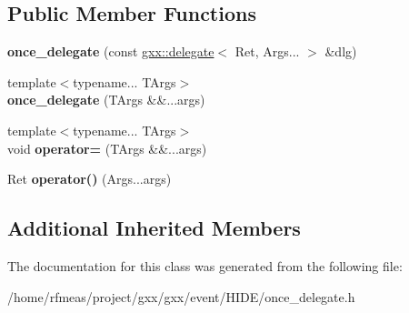 \subsection*{Public Member Functions}
\begin{DoxyCompactItemize}
\item 
{\bfseries once\+\_\+delegate} (const \hyperlink{classgxx_1_1delegate}{gxx\+::delegate}$<$ Ret, Args... $>$ \&dlg)\hypertarget{classgxx_1_1once__delegate_a373ca7b9d120e8d574b3cf8362bbf20b}{}\label{classgxx_1_1once__delegate_a373ca7b9d120e8d574b3cf8362bbf20b}

\item 
{\footnotesize template$<$typename... T\+Args$>$ }\\{\bfseries once\+\_\+delegate} (T\+Args \&\&...args)\hypertarget{classgxx_1_1once__delegate_af947eadfac65f56b0cf446f0d43f0e60}{}\label{classgxx_1_1once__delegate_af947eadfac65f56b0cf446f0d43f0e60}

\item 
{\footnotesize template$<$typename... T\+Args$>$ }\\void {\bfseries operator=} (T\+Args \&\&...args)\hypertarget{classgxx_1_1once__delegate_aee1783b954deb03a7c46e6d1b1c64884}{}\label{classgxx_1_1once__delegate_aee1783b954deb03a7c46e6d1b1c64884}

\item 
Ret {\bfseries operator()} (Args...\+args)\hypertarget{classgxx_1_1once__delegate_a258dca6fed8176ab2f3bc3575cb376c9}{}\label{classgxx_1_1once__delegate_a258dca6fed8176ab2f3bc3575cb376c9}

\end{DoxyCompactItemize}
\subsection*{Additional Inherited Members}


The documentation for this class was generated from the following file\+:\begin{DoxyCompactItemize}
\item 
/home/rfmeas/project/gxx/gxx/event/\+H\+I\+D\+E/once\+\_\+delegate.\+h\end{DoxyCompactItemize}
